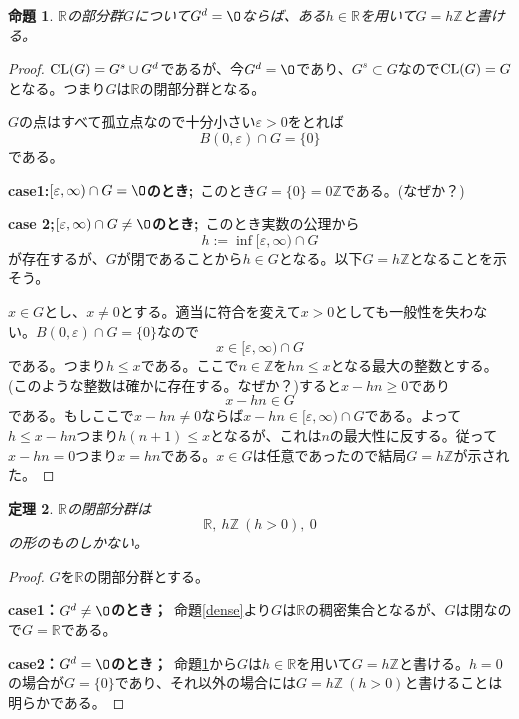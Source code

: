 \documentclass[leqno]{jsarticle}
\newtheorem{thm}{定理}
\newtheorem{prop}[thm]{命題}
\newcommand{\zz}{\mathbb{Z}}
\newcommand{\rr}{\mathbb{R}}
\newcommand{\mgn}{\infty}
\newcommand{\ep}{\varepsilon}
\newcommand{\cl}{\text{{\rm CL}}}
\begin{document}
\begin{prop}\label{disc}
$\rr$の部分群$G$について$G^{d}=\O$ならば、ある$h\in \rr$を用いて$G=h\zz$と書ける。
\end{prop}
\begin{proof}
$\cl (G)=G^s\cup G^d$であるが、今$G^d=\O$であり、$G^{s}\subset G$なので$\cl (G)=G$となる。つまり$G$は$\rr$の閉部分群となる。\par
$G$の点はすべて孤立点なので十分小さい$\ep>0$をとれば
\[
B(0,\ep)\cap G=\{0\}
\]
である。\par
\textbf{case1:$[\ep,\mgn)\cap G=\O$のとき;}\ このとき$G=\{0\}=0\zz$である。(なぜか？)\par
\textbf{case 2;$[\ep,\mgn)\cap G\neq\O$のとき;}\ このとき実数の公理から
\[
h:=\inf [\ep,\mgn)\cap G
\]
が存在するが、$G$が閉であることから$h\in G$となる。以下$G=h\zz$となることを示そう。\par
$x\in G$とし、$x\neq0$とする。適当に符合を変えて$x>0$としても一般性を失わない。$B(0,\ep)\cap G=\{0\}$なので
\[
x\in [\ep,\mgn)\cap G
\]
である。つまり$h\le x$である。ここで$n\in\zz$を$hn\le x$となる最大の整数とする。(このような整数は確かに存在する。なぜか？)すると$x-hn\ge 0$であり
\[
x-hn\in G
\]
である。もしここで$x-hn\neq 0$ならば$x-hn\in [\ep,\mgn)\cap G$である。よって$h \le x-hn$つまり$h(n+1)\le x$となるが、これは$n$の最大性に反する。従って$x-hn=0$つまり$x=hn$である。$x\in G$は任意であったので結局$G=h\zz$が示された。
\end{proof}


\begin{thm}
$\rr$の閉部分群は
\[
\rr,\ h\zz\ (h>0),\ {0}
\]
の形のものしかない。
\end{thm}
\begin{proof}
$G$を$\rr$の閉部分群とする。\par
\textbf{case1：$G^d\neq\O$のとき；}\ 命題\ref{dense}より$G$は$\rr$の稠密集合となるが、$G$は閉なので$G=\rr$である。\par
\textbf{case2：$G^d=\O$のとき；}\ 命題\ref{disc}から$G$は$h\in\rr$を用いて$G=h\zz$と書ける。$h=0$の場合が$G=\{0\}$であり、それ以外の場合には$G=h\zz\ (h>0)$と書けることは明らかである。
\end{proof}
\end{document}
